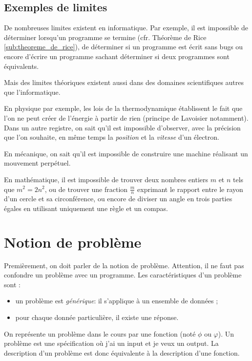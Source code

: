 \subsection{Exemples de limites}
\label{subsec:exemples_limites}

De nombreuses limites existent en informatique. Par exemple, il est impossible de déterminer lorsqu'un programme se termine (cfr. Théorème de Rice \ref{sub:theoreme_de_rice}), de déterminer si un programme est écrit sans bugs ou encore d'écrire un programme sachant déterminer si deux programmes sont équivalents.

Mais des limites théoriques existent aussi dans des domaines scientifiques autres que l'informatique.

En physique par exemple, les lois de la thermodynamique établissent le fait que l'on ne peut créer de l'énergie à partir de rien (principe de Lavoisier notamment). Dans un autre registre, on sait qu'il est impossible d'observer, avec la précision que l'on souhaite, en même temps la \textit{position} et la \textit{vitesse} d'un électron.

En mécanique, on sait qu'il est impossible de construire une machine réalisant un mouvement perpétuel.

En mathématique, il est impossible de trouver deux nombres entiers $m$ et $n$ tels que $m^2 = 2n^2$, ou de trouver une fraction $\frac{m}{n}$ exprimant le rapport entre le rayon d'un cercle et sa circonférence, ou encore de diviser un angle en trois parties égales en utilisant uniquement une règle et un compas.

\section{Notion de problème}
\label{sec:notion_de_probleme}

Premièrement, on doit parler de la notion de problème.
Attention, il ne faut pas confondre un problème avec un programme.
Les caractéristiques d'un problème sont :

\begin{itemize}
	\item un problème est \emph{générique}: il s'applique à un ensemble de données ;
	\item pour chaque donnée particulière, il existe une réponse.
\end{itemize}

On représente un problème dans le cours par une fonction (noté $\phi$ ou $\varphi$).
Un problème est une spécification où j'ai un input et je veux un output.
La description d'un problème est donc équivalente à la description d'une fonction.


